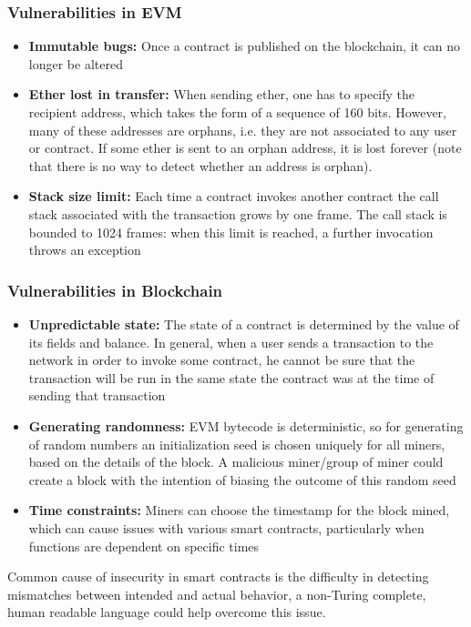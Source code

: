 \subsubsection{Vulnerabilities in EVM}
\begin{itemize}
	\item \textbf{Immutable bugs:} Once a contract is published on the blockchain, it can no longer be altered
	\item\textbf{Ether lost in transfer:} When sending ether, one has to specify the recipient address, which takes the form of a sequence of 160 bits. However, many of these addresses are orphans, i.e. they are not associated to any user or contract. If some ether is sent to an orphan address, it is lost forever (note that there is no way to detect whether an address is orphan).
	\item\textbf{Stack size limit:} Each time a contract invokes another contract the call stack associated with the transaction grows by one frame. The call stack is bounded to 1024 frames: when this limit is reached, a further invocation throws an exception
\end{itemize}
\subsubsection{Vulnerabilities in Blockchain}
\begin{itemize}
	\item \textbf{Unpredictable state:} The state of a contract is determined by the value of its fields and balance. In general, when a user sends a transaction to the network in order to invoke some contract, he cannot be sure that the transaction will be run in the same state the contract was at the time of sending that transaction
	\item\textbf{Generating randomness:} EVM bytecode is deterministic, so for generating of random numbers an initialization seed is chosen uniquely for all miners, based on the details of the block. A malicious miner/group of miner could create a block with the intention of biasing the outcome of this random seed
	\item\textbf{Time constraints:} Miners can choose the timestamp for the block mined, which can cause issues with various smart contracts, particularly when functions are dependent on specific times
\end{itemize}
Common cause of insecurity in smart contracts is the difficulty in detecting mismatches between intended and actual behavior, a non-Turing complete, human readable language could help overcome this issue.